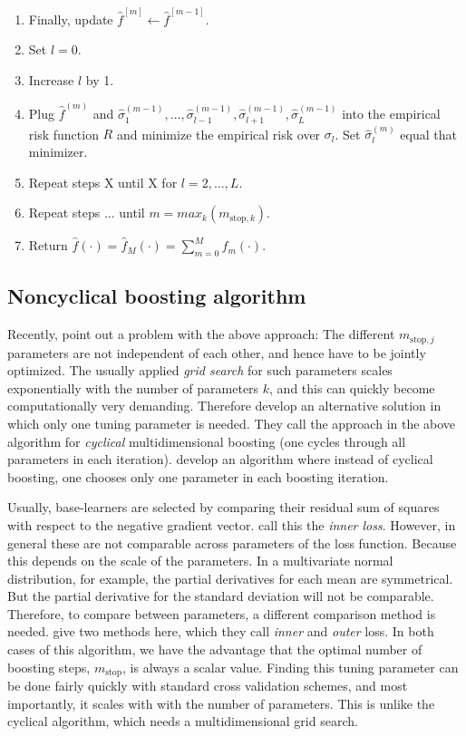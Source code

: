\begin{algorithm}
\begin{enumerate}
    \item Finally, update $\hat{f}^{[m]}\gets\hat{f}^{[m-1]}$.
    \item Set $l=0$.
    \item Increase $l$ by 1.
    \item Plug $\hat{f}^{(m)}$ and $\hat{\sigma}_1^{(m-1)},\ldots,\hat{\sigma}_{l-1}^{(m-1)},\hat{\sigma}_{l+1}^{(m-1)},\hat{\sigma}_{L}^{(m-1)}$ into the empirical risk function $R$ and minimize the empirical risk over $\sigma_l$. Set $\hat{\sigma}_l^{(m)}$ equal that minimizer.
    \item Repeat steps X until X for $l=2,\ldots,L$.
    \item Repeat steps ... until $m=max_k(m_{\text{stop},k})$.
    \item Return $\hat{f}(\cdot)=\hat{f}_M(\cdot)=\sum_{m=0}^Mf_m(\cdot)$.
\end{enumerate}
\end{algorithm}

\subsection{Noncyclical boosting algorithm}
Recently, \citet{thomas2018} point out a problem with the above approach: The different $m_{\text{stop},j}$ parameters are not independent of each other, and hence have to be jointly optimized. The usually applied \textit{grid search} for such parameters scales exponentially with the number of parameters $k$, and this can quickly become computationally very demanding. Therefore \citet{thomas2018} develop an alternative solution in which only one tuning parameter is needed. They call the approach in the above algorithm for \textit{cyclical} multidimensional boosting (one cycles through all parameters in each iteration). \citet{thomas2018} develop an algorithm where instead of cyclical boosting, one chooses only one parameter in each boosting iteration.

Usually, base-learners are selected by comparing their residual sum of squares with respect to the negative gradient vector. \citet{thomas2018} call this the \textit{inner loss}. However, in general these are not comparable across parameters of the loss function. Because this depends on the scale of the parameters. In a multivariate normal distribution, for example, the partial derivatives for each mean are symmetrical. But the partial derivative for the standard deviation will not be comparable. Therefore, to compare between parameters, a different comparison method is needed. \citet{thomas2018} give two methods here, which they call \textit{inner} and \textit{outer} loss. In both cases of this algorithm, we have the advantage that the optimal number of boosting steps, $m_{\text{stop}}$, is always a scalar value. Finding this tuning parameter can be done fairly quickly with standard cross validation schemes, and most importantly, it scales with with the number of parameters. This is unlike the cyclical algorithm, which needs a multidimensional grid search.

